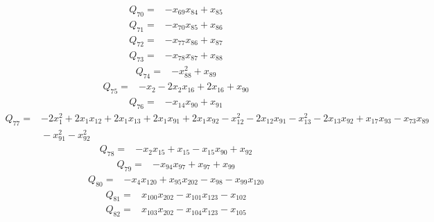 \documentclass[11pt]{article}
\theoremstyle{definition}\newtheorem{definition}[theorem]{Definition}
\begin{document}
{\begin{align*}
 Q_{70}={}&-x_{69}x_{84} +x_{85}
\end{align*}
\begin{align*}
 Q_{71}={}&-x_{70}x_{85} +x_{86}
\end{align*}
\begin{align*}
 Q_{72}={}&-x_{77}x_{86} +x_{87}
\end{align*}
\begin{align*}
 Q_{73}={}&-x_{78}x_{87} +x_{88}
\end{align*}
\begin{align*}
 Q_{74}={}&-x_{88}^{2} +x_{89}
\end{align*}
\begin{align*}
 Q_{75}={}&-x_{2} -2x_{2}x_{16} +2x_{16} +x_{90}
\end{align*}
\begin{align*}
 Q_{76}={}&-x_{14}x_{90} +x_{91}
\end{align*}
\begin{align*}
 Q_{77}={}&-2x_{1}^{2} +2x_{1}x_{12} +2x_{1}x_{13} +2x_{1}x_{91} +2x_{1}x_{92} -x_{12}^{2} -2x_{12}x_{91} -x_{13}^{2} -2x_{13}x_{92} +x_{17}x_{93} -x_{73}x_{89}\\
 &{}-x_{91}^{2} -x_{92}^{2}
\end{align*}
\begin{align*}
 Q_{78}={}&-x_{2}x_{15} +x_{15} -x_{15}x_{90} +x_{92}
\end{align*}
\begin{align*}
 Q_{79}={}&-x_{94}x_{97} +x_{97} +x_{99}
\end{align*}
\begin{align*}
 Q_{80}={}&-x_{4}x_{120} +x_{95}x_{202} -x_{98} -x_{99}x_{120}
\end{align*}
\begin{align*}
 Q_{81}={}&x_{100}x_{202} -x_{101}x_{123} -x_{102}
\end{align*}
\begin{align*}
 Q_{82}={}&x_{103}x_{202} -x_{104}x_{123} -x_{105}
\end{align*}
}
\end{document}
